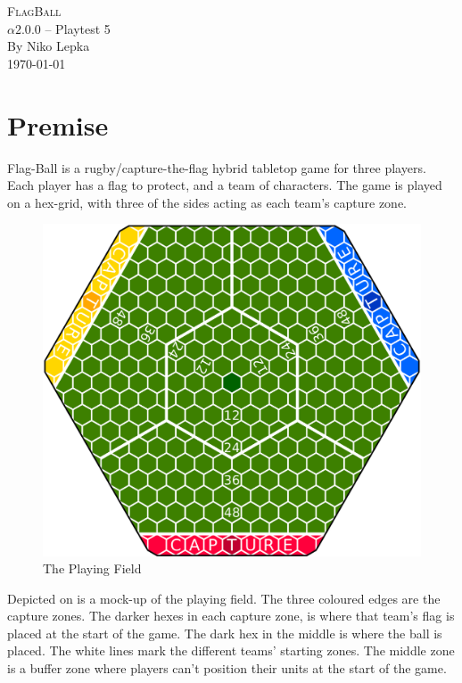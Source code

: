 \documentclass[a4paper]{book}
\begin{document}
\begin{titlepage}
\begin{center}
    \Huge{\textsc{FlagBall}}\\
    \LARGE{
        $\alpha2.0.0$ -- Playtest 5\\
        By Niko Lepka
    }\\
    \Large{\today}
\end{center}
\end{titlepage}
\thispagestyle{empty} %
\frontmatter %

\section*{Premise}
Flag-Ball is a rugby/capture-the-flag hybrid tabletop game for three players.
Each player has a flag to protect, and a team of characters.
The game is played on a hex-grid, with three of the sides acting as each team's capture zone.
\begin{figure}
    \centering
    \includegraphics[width=\textwidth]{graphics/board-2}
    \caption{The Playing Field}
    \label{fig:court}
\end{figure}
Depicted on  is a mock-up of the playing field.
The three coloured edges are the capture zones.
The darker hexes in each capture zone, is where that team's flag is placed at the start of the game.
The dark hex in the middle is where the ball is placed.
The white lines mark the different teams' starting zones.
The middle zone is a buffer zone where players can’t position their units at the start of the game.
\end{document}
